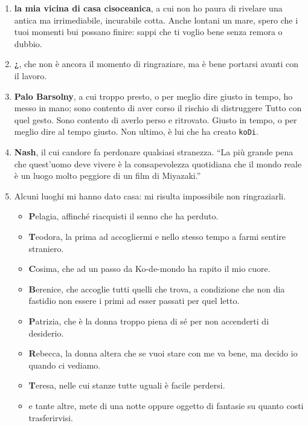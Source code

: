 \begin{enumerate}
\item {\bf la mia vicina di casa cisoceanica}, a cui non ho paura di rivelare una antica ma irrimediabile, incurabile cotta. Anche lontani un mare, spero che i tuoi momenti bui possano finire: sappi che ti voglio bene senza remora o dubbio.
\item {\bf ¿}, che non è ancora il momento di ringraziare, ma è bene portarsi avanti con il lavoro.
\item {\bf Palo Barsolny}, a cui troppo presto, o per meglio dire giusto in tempo, ho messo \cite{working-categories} in mano; sono contento di aver corso il rischio di distruggere Tutto con quel gesto. Sono contento di averlo perso e ritrovato. Giusto in tempo, o per meglio dire al tempo giusto. Non ultimo, è lui che ha creato {\tt koDi}.
\item {\bf Nash}, il cui candore fa perdonare qualsiasi stranezza. ``La più grande pena che quest'uomo deve vivere è la consapevolezza quotidiana che il mondo reale è un luogo molto peggiore di un film di Miyazaki.''
\item Alcuni luoghi mi hanno dato casa: mi risulta impossibile non ringraziarli.
\begin{itemize}
\item {\bf P}elagia, affinché riacquisti il senno che ha perduto.%
\item {\bf T}eodora, la prima ad accogliermi e nello stesso tempo a farmi sentire straniero. %
\item {\bf C}osima, che ad un passo da Ko\hyp{}de\hyp{}mondo ha rapito il mio cuore. %
\item {\bf B}erenice, che accoglie tutti quelli che trova, a condizione che non dia fastidio non essere i primi ad esser passati per quel letto. %
\item {\bf P}atrizia, che è la donna troppo piena di sé per non accenderti di desiderio. %
\item {\bf R}ebecca, la donna altera che se vuoi stare con me va bene, ma decido io quando ci vediamo. %
\item {\bf T}eresa, nelle cui stanze tutte uguali è facile perdersi. %
\item e tante altre, mete di una notte oppure oggetto di fantasie su quanto costi trasferirvisi.
\end{itemize}
\end{enumerate}
